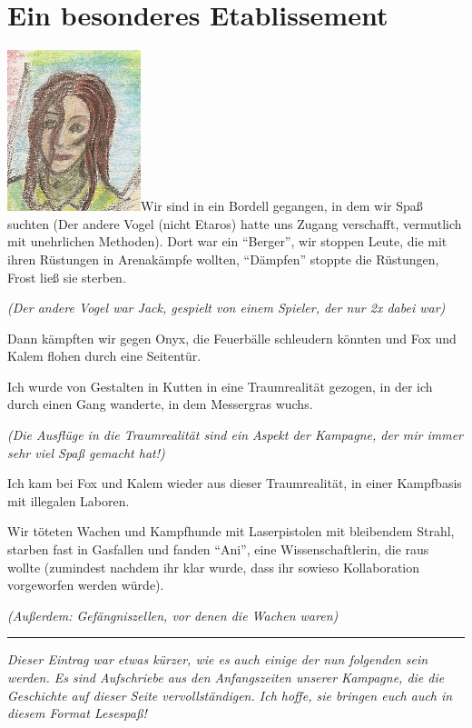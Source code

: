 \documentclass[11pt]{scrartcl}
\begin{document}
\section{Ein besonderes Etablissement}

\includegraphics{sskreszta-portrait-alt-klein.png}Wir sind in ein
Bordell gegangen, in dem wir Spaß suchten (Der andere Vogel (nicht
Etaros) hatte uns Zugang verschafft, vermutlich mit unehrlichen
Methoden). Dort war ein ``Berger'', wir stoppen Leute, die mit ihren
Rüstungen in Arenakämpfe wollten, ``Dämpfen'' stoppte die Rüstungen,
Frost ließ sie sterben.

\emph{(Der andere Vogel war Jack, gespielt von einem Spieler, der nur 2x
dabei war)}

Dann kämpften wir gegen Onyx, die Feuerbälle schleudern könnten und Fox
und Kalem flohen durch eine Seitentür.

Ich wurde von Gestalten in Kutten in eine Traumrealität gezogen, in der
ich durch einen Gang wanderte, in dem Messergras wuchs.

\emph{(Die Ausflüge in die Traumrealität sind ein Aspekt der Kampagne,
der mir immer sehr viel Spaß gemacht hat!)}

Ich kam bei Fox und Kalem wieder aus dieser Traumrealität, in einer
Kampfbasis mit illegalen Laboren.

Wir töteten Wachen und Kampfhunde mit Laserpistolen mit bleibendem
Strahl, starben fast in Gasfallen und fanden ``Ani'', eine
Wissenschaftlerin, die raus wollte (zumindest nachdem ihr klar wurde,
dass ihr sowieso Kollaboration vorgeworfen werden würde).

\emph{(Außerdem: Gefängniszellen, vor denen die Wachen waren)}

\begin{center}\rule{3in}{0.4pt}\end{center}

\emph{Dieser Eintrag war etwas kürzer, wie es auch einige der nun
folgenden sein werden. Es sind Aufschriebe aus den Anfangszeiten unserer
Kampagne, die die Geschichte auf dieser Seite vervollständigen. Ich
hoffe, sie bringen euch auch in diesem Format Lesespaß!}
\end{document}

